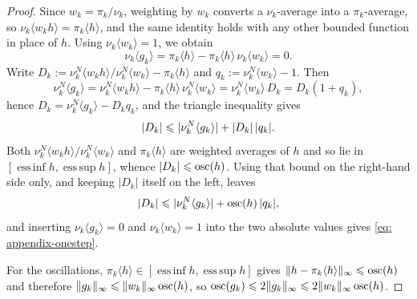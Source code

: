 \documentclass{article}
\begin{document}
\begin{proof}
Since $w_k=\pi_k/\nu_k$, weighting by $w_k$ converts a $\nu_k$-average into a $\pi_k$-average, so $\nu_k\langle w_kh\rangle=\pi_k\langle h\rangle$, and the same identity holds with any other bounded function in place of $h$. Using $\nu_k\langle w_k\rangle=1$, we obtain
\begin{equation*}
    \nu_k\langle g_k\rangle = \pi_k\langle h\rangle - \pi_k\langle h\rangle\,\nu_k\langle w_k\rangle = 0 .
\end{equation*}
Write $D_k := \nu_k^N\langle w_kh\rangle/\nu_k^N\langle w_k\rangle-\pi_k\langle h\rangle$ and $q_k := \nu_k^N\langle w_k\rangle-1$. Then
\begin{equation*}
    \nu_k^N\langle g_k\rangle = \nu_k^N\langle w_kh\rangle - \pi_k\langle h\rangle\,\nu_k^N\langle w_k\rangle
    = \nu_k^N\langle w_k\rangle\,D_k = D_k(1+q_k) ,
\end{equation*}
hence $D_k = \nu_k^N\langle g_k\rangle-D_kq_k$, and the triangle inequality gives
\begin{equation*}
    |D_k|\leqslant|\nu_k^N\langle g_k\rangle|+|D_k|\,|q_k| .
\end{equation*}
Both $\nu_k^N\langle w_kh\rangle/\nu_k^N\langle w_k\rangle$ and $\pi_k\langle h\rangle$ are weighted averages of $h$ and so lie in $[\operatorname{ess\,inf}h,\operatorname{ess\,sup}h]$, whence $|D_k|\leqslant\operatorname{osc}(h)$. Using that bound on the right-hand side only, and keeping $|D_k|$ itself on the left, leaves
\begin{equation*}
    |D_k|\leqslant|\nu_k^N\langle g_k\rangle|+\operatorname{osc}(h)\,|q_k| ,
\end{equation*}
and inserting $\nu_k\langle g_k\rangle=0$ and $\nu_k\langle w_k\rangle=1$ into the two absolute values gives \eqref{eq: appendix-onestep}.

For the oscillations, $\pi_k\langle h\rangle\in[\operatorname{ess\,inf}h,\operatorname{ess\,sup}h]$ gives $\lVert h-\pi_k\langle h\rangle\rVert_\infty\leqslant\operatorname{osc}(h)$ and therefore $\lVert g_k\rVert_\infty\leqslant\lVert w_k\rVert_\infty\operatorname{osc}(h)$, so $\operatorname{osc}(g_k)\leqslant2\lVert g_k\rVert_\infty\leqslant2\lVert w_k\rVert_\infty\operatorname{osc}(h)$.
\end{proof}
\end{document}

